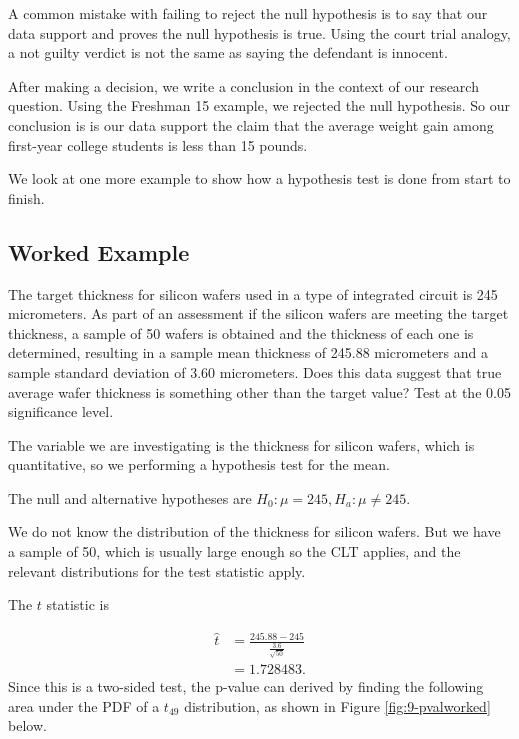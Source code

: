 \documentclass[
]{book}
\begin{document}
A common mistake with failing to reject the null hypothesis is to say that our data support and proves the null hypothesis is true. Using the court trial analogy, a not guilty verdict is not the same as saying the defendant is innocent.

After making a decision, we write a conclusion in the context of our research question. Using the Freshman 15 example, we rejected the null hypothesis. So our conclusion is is our data support the claim that the average weight gain among first-year college students is less than 15 pounds.

We look at one more example to show how a hypothesis test is done from start to finish.

\subsection{Worked Example}\label{wafer}

The target thickness for silicon wafers used in a type of integrated circuit is 245 micrometers. As part of an assessment if the silicon wafers are meeting the target thickness, a sample of 50 wafers is obtained and the thickness of each one is determined, resulting in a sample mean thickness of 245.88 micrometers and a sample standard deviation of 3.60 micrometers. Does this data suggest that true average wafer thickness is something other than the target value? Test at the 0.05 significance level.

The variable we are investigating is the thickness for silicon wafers, which is quantitative, so we performing a hypothesis test for the mean.

The null and alternative hypotheses are \(H_0: \mu = 245, H_a: \mu \neq 245\).

We do not know the distribution of the thickness for silicon wafers. But we have a sample of 50, which is usually large enough so the CLT applies, and the relevant distributions for the test statistic apply.

The \(t\) statistic is

\[
\begin{split}
\hat{t} &= \frac{245.88 - 245}{\frac{3.6}{\sqrt{50}}} \\
        &= 1.728483.
\end{split}
\]
Since this is a two-sided test, the p-value can derived by finding the following area under the PDF of a \(t_{49}\) distribution, as shown in Figure \ref{fig:9-pvalworked} below.
\end{document}
